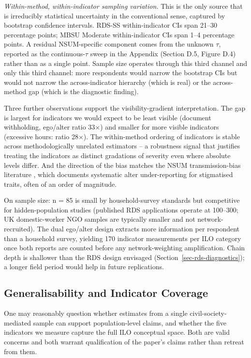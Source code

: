\documentclass[
  12pt,
  letterpaper,
  DIV=11,
  numbers=noendperiod]{scrartcl}
\begin{document}
\emph{Within-method, within-indicator sampling variation.} This is the
only source that is irreducibly statistical uncertainty in the
conventional sense, captured by bootstrap confidence intervals. RDS-SS
within-indicator CIs span 21--30 percentage points; MBSU Moderate
within-indicator CIs span 1--4 percentage points. A residual
NSUM-specific component comes from the unknown \(\tau\), reported as the
continuous-\(\tau\) sweep in the Appendix (Section D.5, Figure D.4)
rather than as a single point. Sample size operates through this third
channel and only this third channel: more respondents would narrow the
bootstrap CIs but would not narrow the across-indicator hierarchy (which
is real) or the across-method gap (which is the diagnostic finding).

Three further observations support the visibility-gradient
interpretation. The gap is largest for indicators we would expect to be
least visible (document withholding, ego/alter ratio 33\(\times\)) and
smaller for more visible indicators (excessive hours: ratio
28\(\times\)). The within-method ordering of indicators is stable across
methodologically unrelated estimators -- a robustness signal that
justifies treating the indicators as distinct gradations of severity
even where absolute levels differ. And the direction of the bias matches
the NSUM transmission-bias literature
\autocite{kill98-social,malt15-estimating,feeh16-generalizing}, which
documents systematic alter under-reporting for stigmatised traits, often
of an order of magnitude.

On sample size: n = 85 is small by household-survey standards but
competitive for hidden-population studies (published RDS applications
operate at 100--300; UK domestic-worker NGO samples are typically
smaller and not network-recruited). The dual ego/alter design extracts
more information per respondent than a household survey, yielding 170
indicator measurements per ILO category once both reports are counted
before any network-weighting amplification. Chain depth is shallower
than the RDS design envisaged (Section~\ref{sec-rds-diagnostics}); a
longer field period would help in future replications.

\subsection{Generalisability and Indicator
Coverage}\label{sec-generalisability}

One may reasonably question whether estimates from a single
civil-society-mediated sample can support population-level claims, and
whether the five indicators we measure capture the full ILO conceptual
space. Both are valid concerns and both warrant qualification of the
paper's claims rather than retreat from them.
\end{document}
